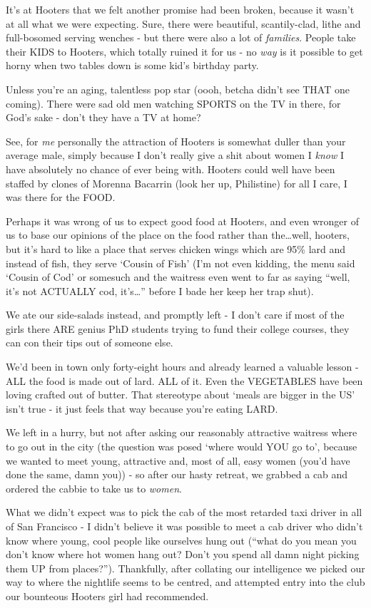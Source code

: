 \documentclass[a5paper,10pt,titlepage,draft]{book}
\begin{document}
It's at Hooters that we felt another promise had been broken, because it wasn't at all what we were expecting.  Sure, there were beautiful, scantily-clad, lithe and full-bosomed serving wenches - but there were also a lot of \emph{families}.  People take their KIDS to Hooters, which totally ruined it for us - no \emph{way} is it possible to get horny when two tables down is some kid's birthday party.

Unless you're an aging, talentless pop star (oooh, betcha didn't see THAT one coming).  There were sad old men watching SPORTS on the TV in there, for God's sake - don't they have a TV at home?

See, for \emph{me} personally the attraction of Hooters is somewhat duller than your average male, simply because I don't really give a shit about women I \emph{know} I have absolutely no chance of ever being with.  Hooters could well have been staffed by clones of Morenna Bacarrin (look her up, Philistine) for all I care, I was there for the FOOD.

Perhaps it was wrong of us to expect good food at Hooters, and even wronger of us to base our opinions of the place on the food rather than the\ldots well, hooters, but it's hard to like a place that serves chicken wings which are 95\% lard and instead of fish, they serve `Cousin of Fish' (I'm not even kidding, the menu said `Cousin of Cod' or somesuch and the waitress even went to far as saying ``well, it's not ACTUALLY cod, it's\ldots'' before I bade her keep her trap shut).

We ate our side-salads instead, and promptly left - I don't care if most of the girls there ARE genius PhD students trying to fund their college courses, they can con their tips out of someone else.

We'd been in town only forty-eight hours and already learned a valuable lesson - ALL the food is made out of lard.  ALL of it.  Even the VEGETABLES have been loving crafted out of butter.  That stereotype about `meals are bigger in the US' isn't true - it just feels that way because you're eating LARD.

We left in a hurry, but not after asking our reasonably attractive waitress where to go out in the city (the question was posed `where would YOU go to', because we wanted to meet young, attractive and, most of all, easy women (you'd have done the same, damn you)) - so after our hasty retreat, we grabbed a cab and ordered the cabbie to take us to \emph{women}.

What we didn't expect was to pick the cab of the most retarded taxi driver in all of San Francisco - I didn't believe it was possible to meet a cab driver who didn't know where young, cool people like ourselves hung out (``what do you mean you don't know where hot women hang out?  Don't you spend all damn night picking them UP from places?'').  Thankfully, after collating our intelligence we picked our way to where the nightlife seems to be centred, and attempted entry into the club our bounteous Hooters girl had recommended.
\end{document}
